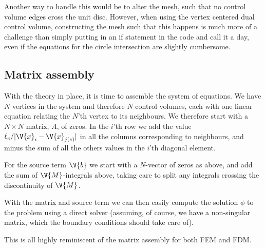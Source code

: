 \documentclass[sigconf]{acmart}
\begin{document}
Another way to handle this would be to alter the mesh, such that no control volume edges cross the unit disc. However, when using the vertex centered dual control volume, constructing the mesh such that this happens is much more of a challenge than simply putting in an if statement in the code and call it a day, even if the equations for the circle intersection are slightly cumbersome.


\subsection{Matrix assembly}
With the theory in place, it is time to assemble the system of equations. We have $ N $ vertices in the system and therefore $ N $ control volumes, each with one linear equation relating the $ N $'th vertex to its neighbours. We therefore start with a $ N\times N $ matrix, $ A $, of zeros. In the $ i $'th row we add the value $ \ell_e/|\V{x}_i-\V{x}_{j(e)}| $ in all the columns corresponding to neighbours, and minus the sum of all the others values in the $ i $'th diagonal element.

For the source term $ \V{b} $ we start with a $ N $-vector of zeros as above, and add the sum of $ \V{M} $-integrals above, taking care to split any integrals crossing the discontinuity of $ \V{M} $.

With the matrix and source term we can then easily compute the solution $ \phi $ to the problem using a direct solver (assuming, of course, we have a non-singular matrix, which the boundary conditions should take care of).

This is all highly reminiscent of the matrix assembly for both FEM and FDM.
\end{document}
